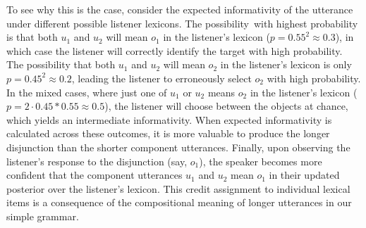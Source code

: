 To see why this is the case, consider the expected informativity of the utterance under different possible listener lexicons.
The possibility with highest probability is that both $u_1$ and $u_2$ will mean $o_1$ in the listener's lexicon ($p = 0.55^2 \approx 0.3$), in which case the listener will correctly identify the target with high probability.
The possibility that both $u_1$ and $u_2$ will mean $o_2$ in the listener's lexicon is only $p=0.45^2 \approx 0.2$, leading the listener to erroneously select $o_2$ with high probability. 
In the mixed cases, where just one of $u_1$ or $u_2$ means $o_2$ in the listener's lexicon ($p = 2 \cdot 0.45 * 0.55 \approx 0.5$), the listener will choose between the objects at chance, which yields an intermediate informativity.
When expected informativity is calculated across these outcomes, it is more valuable to produce the longer disjunction than the shorter component utterances.
Finally, upon observing the listener's response to the disjunction (say, $o_1$), the speaker becomes more confident that the component utterances $u_1$ and $u_2$ mean $o_1$ in their updated posterior over the listener's lexicon.
This credit assignment to individual lexical items is a consequence of the compositional meaning of longer utterances in our simple grammar.

